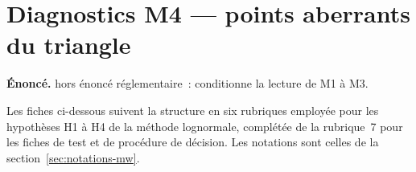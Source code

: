 \documentclass[a4paper,11pt]{article}
\begin{document}
\clearpage
\section{Diagnostics M4 --- points aberrants du triangle}
\label{sec:mwm4}

\begin{encadre}
\textbf{Énoncé.} hors énoncé réglementaire~: conditionne la lecture de M1 à M3.
\end{encadre}

Les fiches ci-dessous suivent la structure en six rubriques employée pour les
hypothèses H1 à H4 de la méthode lognormale, complétée de la rubrique~7 pour les
fiches de test et de procédure de décision. Les notations sont celles de la
section~\ref{sec:notations-mw}.
\end{document}
